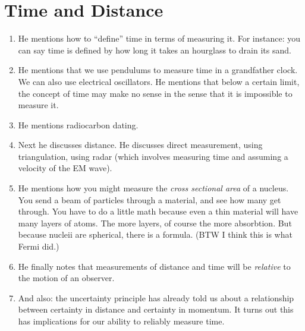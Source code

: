 \section{Time and Distance}

\begin{enumerate}
  \item He mentions how to ``define'' time in terms of measuring it. For
  instance: you can say time is defined by how long it takes an
  hourglass to drain its sand.

  \item He mentions that we use pendulums to measure time in a
  grandfather clock. We can also use electrical oscillators. He mentions
  that below a certain limit, the concept of time may make no sense in
  the sense that it is impossible to measure it.

  \item He mentions radiocarbon dating.

  \item Next he discusses distance. He discusses direct measurement,
  using triangulation, using radar (which involves measuring time and
  assuming a velocity of the EM wave).

  \item He mentions how you might measure the \emph{cross sectional
  area} of a nucleus. You send a beam of particles through a material,
  and see how many get through. You have to do a little math because
  even a thin material will have many layers of atoms. The more layers,
  of course the more absorbtion. But because nucleii are spherical,
  there is a formula. (BTW I think this is what Fermi did.)

  \item He finally notes that measurements of distance and time will be
  \emph{relative} to the motion of an observer.

  \item And also: the uncertainty principle has already told us about a
  relationship between certainty in distance and certainty in momentum.
  It turns out this has implications for our ability to reliably measure
  time.
\end{enumerate}
